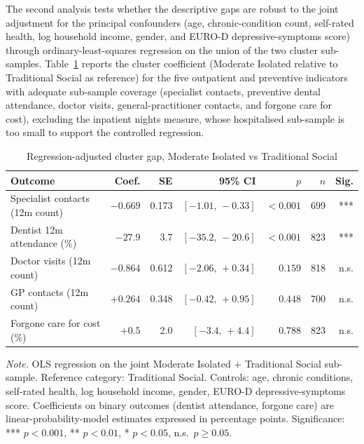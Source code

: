 The second analysis tests whether the descriptive gaps are robust to the joint adjustment for the principal confounders (age, chronic-condition count, self-rated health, log household income, gender, and EURO-D depressive-symptoms score) through ordinary-least-squares regression on the union of the two cluster sub-samples. Table~\ref{tab:ch4-isolation-regression} reports the cluster coefficient (Moderate Isolated relative to Traditional Social as reference) for the five outpatient and preventive indicators with adequate sub-sample coverage (specialist contacts, preventive dental attendance, doctor visits, general-practitioner contacts, and forgone care for cost), excluding the inpatient nights measure, whose hospitalised sub-sample is too small to support the controlled regression.

\begin{table}[!htbp]
  \centering
  \small
  \caption[Regression-adjusted gap, Moderate Isolated vs Traditional Social]{Regression-adjusted cluster gap, Moderate Isolated vs Traditional Social}
  \label{tab:ch4-isolation-regression}
  \renewcommand{\arraystretch}{1.2}
  \setlength{\tabcolsep}{6pt}
  \begin{tabular}{@{}lrrrrrr@{}}
    \toprule
    \textbf{Outcome} & \textbf{Coef.} & \textbf{SE} & \textbf{95\% CI} & \textbf{$p$} & \textbf{$n$} & \textbf{Sig.} \\
    \midrule
    Specialist contacts (12m count)        & $-0.669$ & 0.173 & $[-1.01,\,-0.33]$ & $<\!0.001$ & 699 & *** \\
    Dentist 12m attendance (\%)            & $-27.9$  & 3.7   & $[-35.2,\,-20.6]$ & $<\!0.001$ & 823 & *** \\
    Doctor visits (12m count)              & $-0.864$ & 0.612 & $[-2.06,\,+0.34]$ & $0.159$    & 818 & n.s. \\
    GP contacts (12m count)                & $+0.264$ & 0.348 & $[-0.42,\,+0.95]$ & $0.448$    & 700 & n.s. \\
    Forgone care for cost (\%)             & $+0.5$   & 2.0   & $[-3.4,\,+4.4]$   & $0.788$    & 823 & n.s. \\
    \bottomrule
  \end{tabular}
  \par\medskip
  \begin{minipage}{\linewidth}
    \footnotesize\textit{Note.} OLS regression on the joint Moderate Isolated $+$ Traditional Social sub-sample. Reference category: Traditional Social. Controls: age, chronic conditions, self-rated health, log household income, gender, EURO-D depressive-symptoms score. Coefficients on binary outcomes (dentist attendance, forgone care) are linear-probability-model estimates expressed in percentage points. Significance: *** $p < 0.001$, ** $p < 0.01$, * $p < 0.05$, n.s.\ $p \geq 0.05$.
  \end{minipage}
\end{table}

